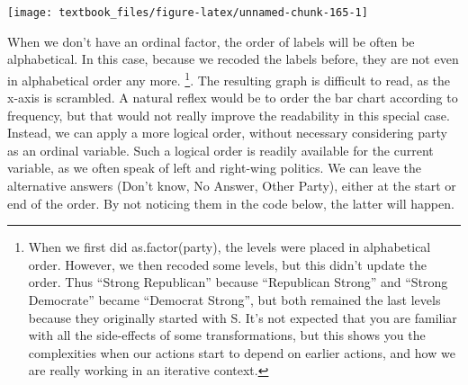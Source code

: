 \documentclass[]{tufte-book}
\newenvironment{Shaded}{}{}
\newcommand{\DataTypeTok}[1]{\textcolor[rgb]{0.56,0.13,0.00}{#1}}
\newcommand{\DecValTok}[1]{\textcolor[rgb]{0.25,0.63,0.44}{#1}}
\newcommand{\KeywordTok}[1]{\textcolor[rgb]{0.00,0.44,0.13}{\textbf{#1}}}
\newcommand{\NormalTok}[1]{#1}
\newcommand{\OperatorTok}[1]{\textcolor[rgb]{0.40,0.40,0.40}{#1}}
\newcommand{\StringTok}[1]{\textcolor[rgb]{0.25,0.44,0.63}{#1}}
\begin{document}
\begin{Shaded}
\end{Shaded}

\texttt{[image: textbook\_files/figure-latex/unnamed-chunk-165-1]}

When we don't have an ordinal factor, the order of labels will be often be alphabetical. In this case, because we recoded the labels before, they are not even in alphabetical order any more. \footnote{When we first did as.factor(party), the levels were placed in alphabetical order. However, we then recoded some levels, but this didn't update the order. Thus ``Strong Republican'' because ``Republican Strong'' and ``Strong Democrate'' became ``Democrat Strong'', but both remained the last levels because they originally started with S. It's not expected that you are familiar with all the side-effects of some transformations, but this shows you the complexities when our actions start to depend on earlier actions, and how we are really working in an iterative context.}. The resulting graph is difficult to read, as the x-axis is scrambled. A natural reflex would be to order the bar chart according to frequency, but that would not really improve the readability in this special case. Instead, we can apply a more logical order, without necessary considering party as an ordinal variable. Such a logical order is readily available for the current variable, as we often speak of left and right-wing politics. We can leave the alternative answers (Don't know, No Answer, Other Party), either at the start or end of the order. By not noticing them in the code below, the latter will happen.

\begin{Shaded}
\end{Shaded}
\end{document}
